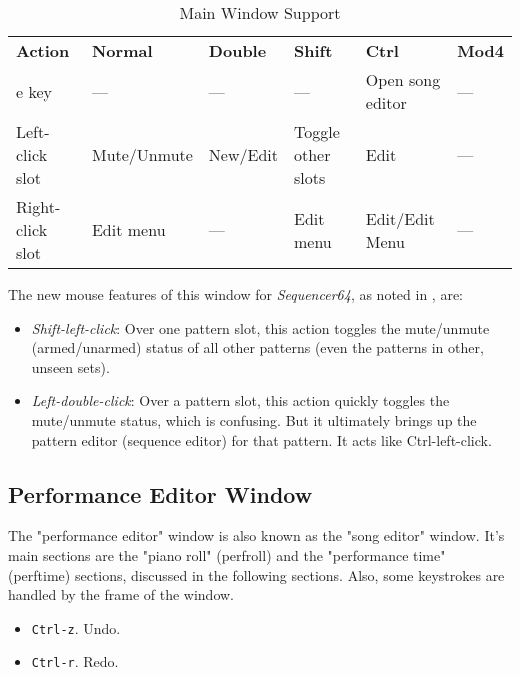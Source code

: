    \begin{table}[H]
      \centering
      \caption{Main Window Support}
      \label{table:main_window_support}
      \begin{tabular}{l l l l l l}
         \textbf{Action}   & \textbf{Normal} & \textbf{Double}    & \textbf{Shift}      & \textbf{Ctrl}    & \textbf{Mod4}      \\
         e key             & ---             & ---                & ---                 & Open song editor & ---                \\
         Left-click slot   & Mute/Unmute     & New/Edit           & Toggle other slots  & Edit             & ---                \\
         Right-click slot  & Edit menu       & ---                & Edit menu           & Edit/Edit Menu   & ---                \\
      \end{tabular}
   \end{table}

   The new mouse features of this window for \textsl{Sequencer64},
   as noted in , are:

   \begin{itemize}
      \item \textsl{Shift-left-click}:
         Over one pattern slot, this action toggles the mute/unmute (armed/unarmed)
         status of all other patterns (even the patterns in other,
         unseen sets).
      \item \textsl{Left-double-click}:
         Over a pattern slot, this action quickly toggles the mute/unmute status,
         which is confusing.  But it ultimately brings up the pattern editor
         (sequence editor) for that pattern.  It acts like
         Ctrl-left-click.
   \end{itemize}

\subsection{Performance Editor Window}
\label{subsec:kbd_mouse_performance_editor_window}

   The "performance editor" window is also known as the "song editor" window.
   It's main sections are the "piano roll" (perfroll) and the "performance
   time" (perftime) sections, discussed in the following sections.
   Also, some keystrokes are handled by the frame of the window.

   \begin{itemize}
      \item \texttt{Ctrl-z}. Undo.
      \item \texttt{Ctrl-r}. Redo.
   \end{itemize}


